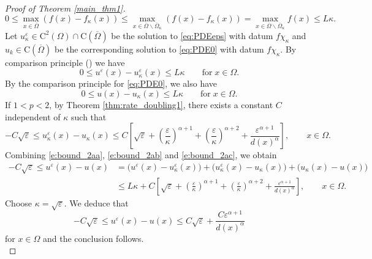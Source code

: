 \documentclass[12pt,reqno]{amsart}
\numberwithin{figure}{section}
\theoremstyle{plain}
\theoremstyle{remark}
\numberwithin{equation}{section}
\newcommand{\rmC}{\mathrm{C}}
\begin{document}
\begin{proof}[Proof of Theorem \ref{main_thm1}]
\begin{equation*}
    0\leq \max_{x\in \overline{\Omega}} (f(x) - f_\kappa(x)) \leq \max_{x\in \overline{\Omega}\backslash \overline{\Omega}_\kappa} (f(x) - f_\kappa(x)) = \max_{x\in \overline{\Omega}\backslash \overline{\Omega}_\kappa} f(x) \leq L\kappa.
\end{equation*}
Let $u^\varepsilon_\kappa\in \rmC^2(\Omega)\cap\rmC(\overline{\Omega})$ be the solution to \eqref{eq:PDEeps} with datum $f\chi_{\kappa}$ and $u_k\in \mathrm{C}(\overline{\Omega})$ be the corresponding solution to \eqref{eq:PDE0} with datum $f{\chi_\kappa}$. By comparison principle (\cite[Corollary II.1]{Lasry1989}) we have
\begin{equation}\label{e:bound_2aa}
    0\leq u^\varepsilon(x) - u^\varepsilon_\kappa(x) \leq L\kappa \qquad\text{for}\;x\in \Omega.
\end{equation}
By the comparison principle for \eqref{eq:PDE0}, we also have
\begin{equation}\label{e:bound_2ab}
    0\leq u(x) - u_\kappa(x) \leq L\kappa \qquad\text{for}\;x\in \Omega.
\end{equation}
If $1<p<2$, by Theorem \ref{thm:rate_doubling1}, there exists a constant $C$ independent of $\kappa$ such that
\begin{equation}\label{e:bound_2ac}
    -C\sqrt{\varepsilon}\leq u^\varepsilon_\kappa(x) - u_\kappa(x)\leq C\left[\sqrt{\varepsilon} + \left(\frac{\varepsilon}{\kappa}\right)^{\alpha+1} + \left(\frac{\varepsilon}{\kappa}\right)^{\alpha+2} + \frac{\varepsilon^{\alpha+1}}{d(x)^\alpha}\right], \qquad x\in \Omega.
\end{equation}
Combining \eqref{e:bound_2aa}, \eqref{e:bound_2ab} and \eqref{e:bound_2ac}, we obtain
\begin{equation*}
\begin{split}
   -C\sqrt{\varepsilon}\leq u^\varepsilon(x) - u(x) &= \Big(u^\varepsilon(x) - u^\varepsilon_\kappa(x)\Big) + \Big(u^\varepsilon_\kappa(x) - u_\kappa(x)\Big) + \Big(u_\kappa(x) - u(x)\Big) \\
    &\leq L\kappa + C\left[\sqrt{\varepsilon} + \left(\frac{\varepsilon}{\kappa}\right)^{\alpha+1} + \left(\frac{\varepsilon}{\kappa}\right)^{\alpha+2} + \frac{\varepsilon^{\alpha+1}}{d(x)^\alpha}\right], \qquad x\in \Omega.
\end{split}
\end{equation*}
Choose $\kappa = \sqrt{\varepsilon}$. We deduce that
\begin{equation*}
    -C\sqrt{\varepsilon}\leq u^\varepsilon(x) - u(x) \leq C\sqrt{\varepsilon} + \frac{C\varepsilon^{\alpha+1}}{d(x)^\alpha}
\end{equation*}
for $x\in \Omega$ and the conclusion follows. \\


\end{proof}
\end{document}
